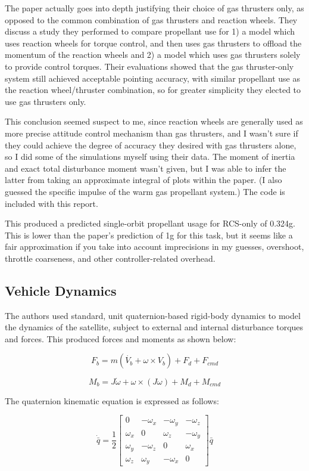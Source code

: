 \documentclass[letterpaper, 11 pt, conference]{ieeeconf}  %
\begin{document}
The paper actually goes into depth justifying their choice of gas thrusters only, as opposed to the common combination of gas thrusters and reaction wheels. They discuss a study they performed to compare propellant use for 1) a model which uses reaction wheels for torque control, and then uses gas thrusters to offload the momentum of the reaction wheels and 2) a model which uses gas thrusters solely to provide control torques. Their evaluations showed that the gas thruster-only system still achieved acceptable pointing accuracy, with similar propellant use as the reaction wheel/thruster combination, so for greater simplicity they elected to use gas thrusters only.

This conclusion seemed suspect to me, since reaction wheels are generally used as more precise attitude control mechanism than gas thrusters, and I wasn't sure if they could achieve the degree of accuracy they desired with gas thrusters alone, so I did some of the simulations myself using their data. The moment of inertia and exact total disturbance moment wasn't given, but I was able to infer the latter from taking an approximate integral of plots within the paper. (I also guessed the specific impulse of the warm gas propellant system.) The code is included with this report.

This produced a predicted single-orbit propellant usage for RCS-only of 0.324g. This is lower than the paper's prediction of 1g for this task, but it seems like a fair approximation if you take into account imprecisions in my guesses, overshoot, throttle coarseness, and other controller-related overhead.

\subsection{Vehicle Dynamics}

The authors used standard, unit quaternion-based rigid-body dynamics to model the dynamics of the satellite, subject to external and internal disturbance torques and forces. This produced forces and moments as shown below:

\[
F_{b} = m(\dot{V_{b}} + \omega \times V_{b}) + F_{d} + F_{cmd}
\]

\[
M_{b} = J \dot{\omega} + \omega \times (J \omega) + M_{d} + M_{cmd}
\]

The quaternion kinematic equation is expressed as follows:

\[
\dot{\bar{q}}=\frac{1}{2}\left[
\begin{array}{cccc}
 0 & -\omega _x & -\omega _y & -\omega _z \\
 \omega _x & 0 & \omega _z & -\omega _y \\
 \omega _y & -\omega _z & 0 & \omega _x \\
 \omega _z & \omega _y & -\omega _x & 0
\end{array}
\right]\bar{q}
\]
\end{document}
